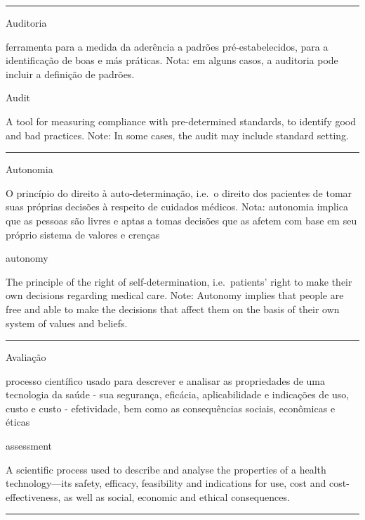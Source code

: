 \documentclass[
  openany]{book}
\begin{document}
\begin{center}\rule{0.5\linewidth}{0.5pt}\end{center}

Auditoria

ferramenta para a medida da aderência a padrões pré-estabelecidos, para a identificação de boas e más práticas. Nota: em alguns casos, a auditoria pode incluir a definição de padrões.

Audit

A tool for measuring compliance with pre-determined standards, to identify good and bad practices. Note: In some cases, the audit may include standard setting.

\begin{center}\rule{0.5\linewidth}{0.5pt}\end{center}

Autonomia

O princípio do direito à auto-determinação, i.e.~o direito dos pacientes de tomar suas próprias decisões à respeito de cuidados médicos. Nota: autonomia implica que as pessoas são livres e aptas a tomas decisões que as afetem com base em seu próprio sistema de valores e crenças

autonomy

The principle of the right of self-determination, i.e.~patients' right to make their own decisions regarding medical care. Note: Autonomy implies that people are free and able to make the decisions that affect them on the basis of their own system of values and beliefs.

\begin{center}\rule{0.5\linewidth}{0.5pt}\end{center}

Avaliação

processo científico usado para descrever e analisar as propriedades de uma tecnologia da saúde - sua segurança, eficácia, aplicabilidade e indicações de uso, custo e custo - efetividade, bem como as consequências sociais, econômicas e éticas

assessment

A scientific process used to describe and analyse the properties of a health technology---its safety, efficacy, feasibility and indications for use, cost and cost-effectiveness, as well as social, economic and ethical consequences.

\begin{center}\rule{0.5\linewidth}{0.5pt}\end{center}
\end{document}
